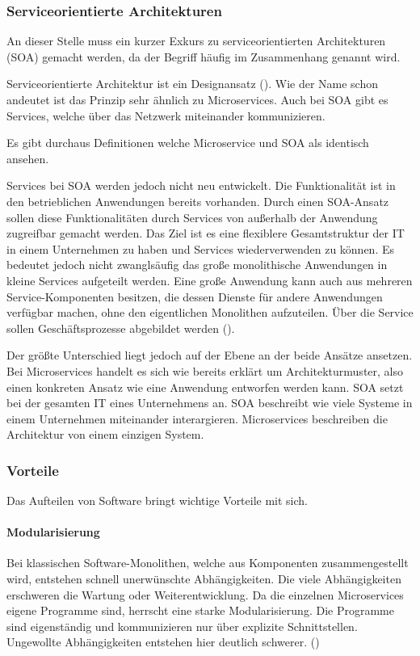 \subsubsection{Serviceorientierte Architekturen}

An dieser Stelle muss ein kurzer Exkurs zu serviceorientierten Architekturen (SOA) gemacht werden, da der Begriff häufig im Zusammenhang genannt wird. 

Serviceorientierte Architektur ist ein Designansatz (\cite[S. 29]{newmanMicroservices2015}). Wie der Name schon andeutet ist das Prinzip sehr ähnlich zu Microservices. Auch bei SOA gibt es Services, welche über das Netzwerk miteinander kommunizieren.
  
Es gibt durchaus Definitionen welche Microservice und SOA als identisch ansehen. 

Services bei SOA werden jedoch nicht neu entwickelt. Die Funktionalität ist in den betrieblichen Anwendungen bereits vorhanden. Durch einen SOA-Ansatz sollen diese Funktionalitäten durch Services von außerhalb der Anwendung zugreifbar gemacht werden. Das Ziel ist es eine flexiblere Gesamtstruktur der IT in einem Unternehmen zu haben und Services wiederverwenden zu können. Es bedeutet jedoch nicht zwanglsäufig das große monolithische Anwendungen in kleine Services aufgeteilt werden. Eine große Anwendung kann auch aus mehreren Service-Komponenten besitzen, die dessen Dienste für andere Anwendungen verfügbar machen, ohne den eigentlichen Monolithen aufzuteilen. Über die Service sollen Geschäftsprozesse abgebildet werden (\cite[S. 2]{wolffMicroservices2018}).

Der größte Unterschied liegt jedoch auf der Ebene an der beide Ansätze ansetzen. Bei Microservices handelt es sich wie bereits erklärt um Architekturmuster, also einen konkreten Ansatz wie eine Anwendung entworfen werden kann. SOA setzt bei der gesamten IT eines Unternehmens an. SOA beschreibt wie viele Systeme in einem Unternehmen miteinander interargieren. Microservices beschreiben die Architektur von einem einzigen System. 


\subsubsection{Vorteile}

Das Aufteilen von Software bringt wichtige Vorteile mit sich.

\paragraph{Modularisierung}
Bei klassischen Software-Monolithen, welche aus Komponenten zusammengestellt wird, entstehen schnell unerwünschte Abhängigkeiten. Die viele Abhängigkeiten erschweren die Wartung oder Weiterentwicklung. Da die einzelnen Microservices eigene Programme sind, herrscht eine starke Modularisierung. Die Programme sind eigenständig und kommunizieren nur über explizite Schnittstellen. Ungewollte Abhängigkeiten entstehen hier deutlich schwerer. (\cite[S. 3]{wolffMicroservices2018})

